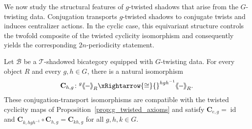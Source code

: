 \documentclass[11pt,oneside]{amsart}
\DeclareMathOperator{\id}{id}
\numberwithin{equation}{section}
\numberwithin{figure}{section}
\theoremstyle{plain}
\theoremstyle{definition}
\theoremstyle{remark}
\newcommand{\shspace}{\hspace{.5mm}} %
\newcommand{\sh}[1]{{\ensuremath{\shspace\hspace{1mm}\makebox[-1mm]{$\langle$}\makebox[0mm]{$\langle$}\hspace{1mm}{#1}\makebox[1mm]{$\rangle$}\makebox[0mm]{$\rangle$}\shspace}}}
\begin{document}
 
We now study the structural features of \(g\)-twisted shadows that arise from 
the \(G\)-twisting data. Conjugation transports \(g\)-twisted shadows to conjugate twists and induces centralizer actions.
In the cyclic case, this equivariant structure controls the twofold composite 
of the twisted cyclicity isomorphism and consequently yields the corresponding 
\(2n\)-periodicity statement.

\begin{prop}\label{prop:conj-transport-twisted-shadows}
Let \(\mathcal B\) be a \(\mathcal T\)-shadowed bicategory equipped
with \(G\)-twisting data. For every object \(R\) and every
\(g,h\in G\), there is a natural isomorphism
\[
\mathbf C_{h,g}\colon
{}^g\sh{-}_R
\xRightarrow{\cong}
{}^{hgh^{-1}}\sh{-}_R.
\]
These conjugation-transport isomorphisms are compatible with the
twisted cyclicity maps of
Proposition~\ref{prop:g_twisted_axioms} and satisfy
\(
\mathbf C_{e,g}=\id\) and \(
\mathbf C_{k,hgh^{-1}}\circ\mathbf C_{h,g}
=
\mathbf C_{kh,g}
\)
for all \(g,h,k\in G\).
\end{prop}
\end{document}

